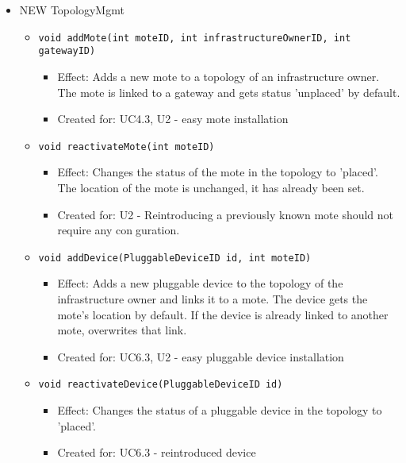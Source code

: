 {{{\begin{itemize}
        	\item NEW TopologyMgmt
            	\begin{itemize}
            		\item \texttt{void addMote(int moteID, int infrastructureOwnerID, int gatewayID)}
                		\begin{itemize}
                            \item Effect: Adds a new mote to a topology of an infrastructure owner. The mote is linked to a gateway and gets status 'unplaced' by default.
                			\item Created for: UC4.3, U2 - easy mote installation
                		\end{itemize}
                    \item \texttt{void reactivateMote(int moteID)}
                        \begin{itemize}
                            \item Effect: Changes the status of the mote in the topology to 'placed'. The location of the mote is unchanged, it has already been set.
                            \item Created for: U2 - Reintroducing a previously known mote should not require any conguration.
                        \end{itemize}
                    \item \texttt{void addDevice(PluggableDeviceID id, int moteID)}
                        \begin{itemize}
                            \item Effect: Adds a new pluggable device to the topology of the infrastructure owner and links it to a mote. The device gets the mote's location by default. If the device is already linked to another mote, overwrites that link.
                            \item Created for: UC6.3, U2 - easy pluggable device installation
                        \end{itemize}
                    \item \texttt{void reactivateDevice(PluggableDeviceID id)}
                        \begin{itemize}
                            \item Effect: Changes the status of a pluggable device in the topology to 'placed'.
                            \item Created for: UC6.3 - reintroduced device
                        \end{itemize}
            	\end{itemize}
        \end{itemize}

}}}
